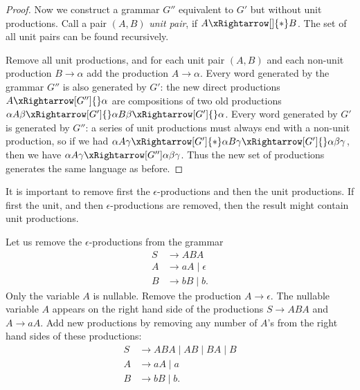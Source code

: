\begin{page}
\begin{proof}
Now we construct a grammar $G''$ equivalent to $G'$ but without unit productions.
Call a pair $(A, B)$ \emph{unit pair}, if $A \xRightarrow[]{*} B$.
The set of all unit pairs can be found recursively.

Remove all unit productions, and for each unit pair $(A, B)$ and each non-unit production $B \to \alpha$ add the production $A \to \alpha$.
Every word generated by the grammar $G''$ is also generated by $G'$:
the new direct productions $A \xRightarrow[G'']{} \alpha$ are compositions of two old productions
$\alpha A \beta \xRightarrow[G']{} \alpha B \beta \xRightarrow[G']{} \alpha$.
Every word generated by $G'$ is generated by $G''$: a series of unit productions must always end with a non-unit production,
so if we had $\alpha A \gamma \xRightarrow[G']{*} \alpha B \gamma \xRightarrow[G']{} \alpha\beta\gamma$,
then we have $\alpha A \gamma \xRightarrow[G''] \alpha\beta\gamma$.
Thus the new set of productions generates the same language as before.
\end{proof}
It is important to remove first the $\epsilon$-productions and then the unit productions.
If first the unit, and then $\epsilon$-productions are removed, then the result might contain unit productions.


\end{page}

\begin{page}
\setcounter{section}{5}
\setcounter{subsection}{2}
\setcounter{dfn}{9}
\label{portion:1235}

\begin{exl}
Let us remove the $\epsilon$-productions from the grammar
\begin{align*}
S &\to ABA\\
A &\to aA \mid \epsilon\\
B &\to bB \mid b.
\end{align*}
Only the variable $A$ is nullable.
Remove the production $A \to \epsilon$.
The nullable variable $A$ appears on the right hand side of the productions $S \to ABA$ and $A \to aA$.
Add new productions by removing any number of $A$'s from the right hand sides of these productions:
\begin{align*}
S &\to ABA \mid AB \mid BA \mid B\\
A &\to aA \mid a\\
B &\to bB \mid b.
\end{align*}
\end{exl}

\end{page}

